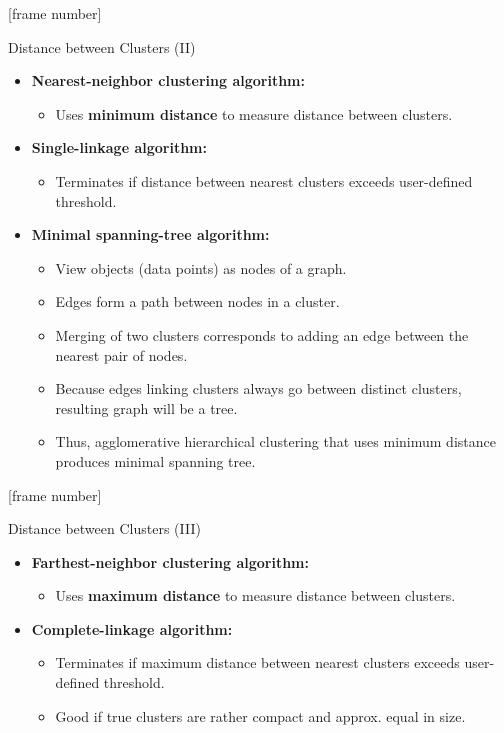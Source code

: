 \documentclass[aspectratio=169,t,xcolor=dvipsnames]{beamer}
\begin{document}
  { %
    [frame number]
    \begin{frame}{Distance between Clusters (II)}
      \begin{itemize}
        \item \textbf{Nearest-neighbor clustering algorithm:}
        \begin{itemize}
          \item Uses \textbf{\color{airforceblue}minimum distance} to measure distance between clusters.
        \end{itemize}
        \item \textbf{Single-linkage algorithm:}
        \begin{itemize}
          \item Terminates if distance between nearest clusters exceeds user-defined threshold.
        \end{itemize}
        \item \textbf{Minimal spanning-tree algorithm:}
        \begin{itemize}
          \item View objects (data points) as nodes of a graph.
          \item Edges form a path between nodes in a cluster.
          \item Merging of two clusters corresponds to adding an edge between the nearest pair of nodes.
          \item Because edges linking clusters always go between distinct clusters,\\
          resulting graph will be a tree.
          \item Thus, agglomerative hierarchical clustering that uses minimum distance produces minimal spanning tree.
        \end{itemize}
      \end{itemize}
    \end{frame}
  }

  { %
    [frame number]
    \begin{frame}{Distance between Clusters (III)}
      \begin{itemize}
        \item \textbf{Farthest-neighbor clustering algorithm:}
        \begin{itemize}
          \item Uses \textbf{\color{airforceblue}maximum distance} to measure distance between clusters.
        \end{itemize}
        \item \textbf{Complete-linkage algorithm:}
        \begin{itemize}
          \item Terminates if maximum distance between nearest clusters exceeds user-defined threshold.
          \item Good if true clusters are rather compact and approx. equal in size.
        \end{itemize}
      \end{itemize}
    \end{frame}
  }
\end{document}
